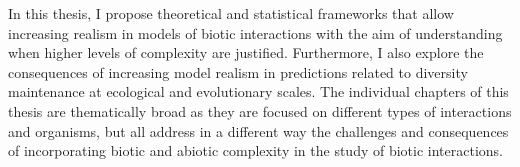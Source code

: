 \begin{refsection}

In this thesis, I propose theoretical and statistical frameworks that allow increasing realism in models of biotic interactions with the aim of understanding when higher levels of complexity are justified. Furthermore, I also explore the consequences of increasing model realism in predictions related to diversity maintenance at ecological and evolutionary scales. The individual chapters of this thesis are thematically broad as they are focused on different types of interactions and organisms, but all address in a different way the challenges and consequences of incorporating biotic and abiotic complexity in the study of biotic interactions.


\printbibliography
\end{refsection}
